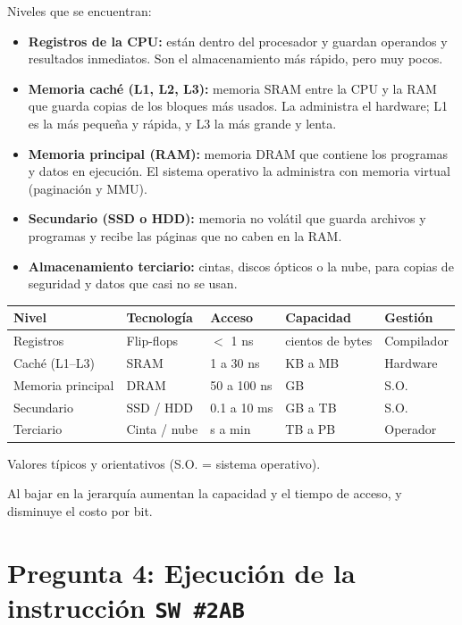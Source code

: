 \documentclass[10pt]{article}
\begin{document}
Niveles que se encuentran:
 
\begin{itemize}
  \item \textbf{Registros de la CPU:} están dentro del procesador y guardan operandos y resultados inmediatos. Son el almacenamiento más rápido, pero muy pocos.
  \item \textbf{Memoria caché (L1, L2, L3):} memoria SRAM entre la CPU y la RAM que guarda copias de los bloques más usados. La administra el hardware; L1 es la más pequeña y rápida, y L3 la más grande y lenta.
  \item \textbf{Memoria principal (RAM):} memoria DRAM que contiene los programas y datos en ejecución. El sistema operativo la administra con memoria virtual (paginación y MMU).
  \item \textbf{Secundario (SSD o HDD):} memoria no volátil que guarda archivos y programas y recibe las páginas que no caben en la RAM.
  \item \textbf{Almacenamiento terciario:} cintas, discos ópticos o la nube, para copias de seguridad y datos que casi no se usan.
\end{itemize}
 
\begingroup
\footnotesize
\setlength{\tabcolsep}{4pt}
\begin{center}
\begin{tabular}{|l|l|l|l|l|}
  \hline
  \textbf{Nivel} & \textbf{Tecnología} & \textbf{Acceso} & \textbf{Capacidad} & \textbf{Gestión} \\
  \hline
  Registros & Flip-flops & $<$ 1 ns & cientos de bytes & Compilador \\
  \hline
  Caché (L1--L3) & SRAM & 1 a 30 ns & KB a MB & Hardware \\
  \hline
  Memoria principal & DRAM & 50 a 100 ns & GB & S.O. \\
  \hline
  Secundario & SSD / HDD & 0.1 a 10 ms & GB a TB & S.O. \\
  \hline
  Terciario & Cinta / nube & s a min & TB a PB & Operador \\
  \hline
\end{tabular}
\end{center}
Valores típicos y orientativos (S.O. = sistema operativo).
\endgroup
 
Al bajar en la jerarquía aumentan la capacidad y el tiempo de acceso, y disminuye el costo por bit.
 
\section{Pregunta 4: Ejecución de la instrucción \texttt{SW \#2AB}}
 
\end{document}
